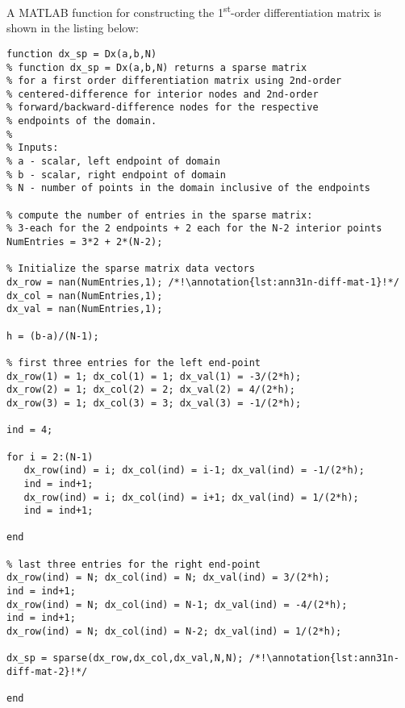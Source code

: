 A MATLAB function for constructing the 1\textsuperscript{st}-order differentiation matrix is shown in the listing below:
\begin{lstlisting}[style=myMatlab,name=lec31n-yp-mat]
function dx_sp = Dx(a,b,N)
% function dx_sp = Dx(a,b,N) returns a sparse matrix
% for a first order differentiation matrix using 2nd-order
% centered-difference for interior nodes and 2nd-order
% forward/backward-difference nodes for the respective 
% endpoints of the domain.
%
% Inputs:
% a - scalar, left endpoint of domain
% b - scalar, right endpoint of domain
% N - number of points in the domain inclusive of the endpoints

% compute the number of entries in the sparse matrix:
% 3-each for the 2 endpoints + 2 each for the N-2 interior points
NumEntries = 3*2 + 2*(N-2);

% Initialize the sparse matrix data vectors
dx_row = nan(NumEntries,1); /*!\annotation{lst:ann31n-diff-mat-1}!*/
dx_col = nan(NumEntries,1);
dx_val = nan(NumEntries,1);

h = (b-a)/(N-1);

% first three entries for the left end-point
dx_row(1) = 1; dx_col(1) = 1; dx_val(1) = -3/(2*h);
dx_row(2) = 1; dx_col(2) = 2; dx_val(2) = 4/(2*h);
dx_row(3) = 1; dx_col(3) = 3; dx_val(3) = -1/(2*h);

ind = 4;

for i = 2:(N-1)
   dx_row(ind) = i; dx_col(ind) = i-1; dx_val(ind) = -1/(2*h);
   ind = ind+1;
   dx_row(ind) = i; dx_col(ind) = i+1; dx_val(ind) = 1/(2*h);
   ind = ind+1;   
    
end

% last three entries for the right end-point
dx_row(ind) = N; dx_col(ind) = N; dx_val(ind) = 3/(2*h);
ind = ind+1;
dx_row(ind) = N; dx_col(ind) = N-1; dx_val(ind) = -4/(2*h);
ind = ind+1;
dx_row(ind) = N; dx_col(ind) = N-2; dx_val(ind) = 1/(2*h);

dx_sp = sparse(dx_row,dx_col,dx_val,N,N); /*!\annotation{lst:ann31n-diff-mat-2}!*/

end
\end{lstlisting}

